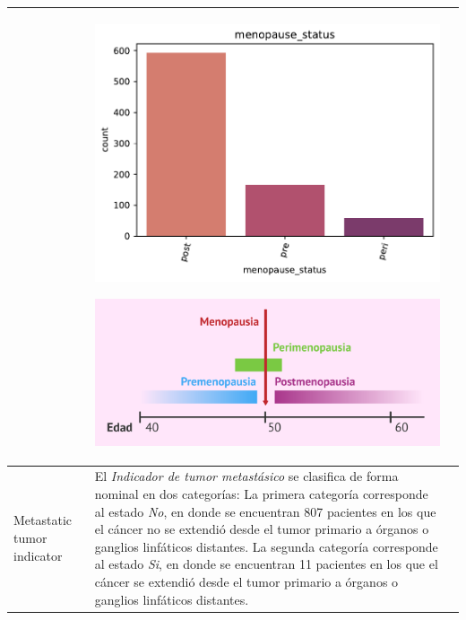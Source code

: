 \begin{table}[!htb]
\begin{threeparttable}
\begin{tabular}{p{2.5cm} p{7cm} p{6.5cm}}
			& \begin{center}\includegraphics[width=1\linewidth]{NOTEBOOK/IMAGENES_DESCRIPTIVAS/25_menopause_status}\end{center}
			\begin{center}\includegraphics[width=1\linewidth]{IMAGENES/menopausia}\end{center}
			\\ \hline
			
			Metastatic tumor indicator
			& El \textit{Indicador de tumor metastásico} se clasifica de forma nominal en dos categorías: La primera categoría corresponde al estado \textit{No}, en donde se encuentran 807 pacientes en los que el cáncer no se extendió desde el tumor primario a órganos o ganglios linfáticos distantes. La segunda categoría corresponde al estado \textit{Si}, en donde se encuentran 11 pacientes en los que el cáncer se extendió desde el tumor primario a órganos o ganglios linfáticos distantes.
			

\end{tabular}
\end{threeparttable}
\end{table}
